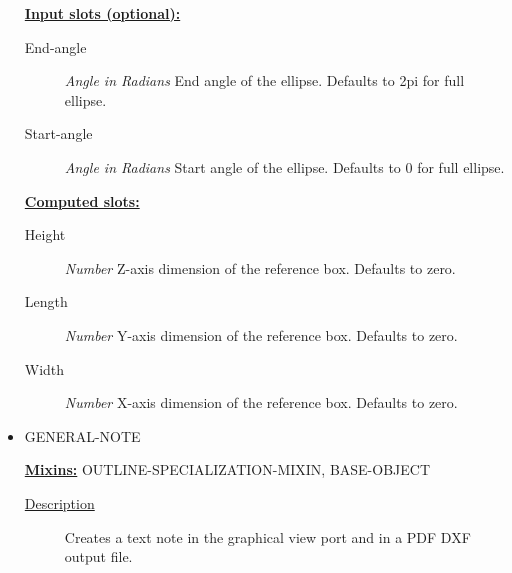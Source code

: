 \documentclass [11pt]{book}
\begin{document}
\begin{itemize}
\begin{description}
\end{description}






\textbf{
\underline{Input slots (optional):}}

\begin{description}

\item [End-angle]
\emph{Angle in Radians} End angle of the ellipse. Defaults to 2pi for full ellipse.


\item [Start-angle]
\emph{Angle in Radians} Start angle of the ellipse. Defaults to 0 for full ellipse.


\end{description}






\textbf{
\underline{Computed slots:}}

\begin{description}

\item [Height]
\emph{Number} Z-axis dimension of the reference box. Defaults to zero.


\item [Length]
\emph{Number} Y-axis dimension of the reference box. Defaults to zero.


\item [Width]
\emph{Number} X-axis dimension of the reference box. Defaults to zero.


\end{description}







\item {}GENERAL-NOTE


\textbf{
\underline{Mixins:}} OUTLINE-SPECIALIZATION-MIXIN, BASE-OBJECT





\begin{description}

\item [
\underline{Description}]


Creates a text note in the graphical view port and in a PDF DXF output file.




\end{description}
\end{itemize}
\end{document}
